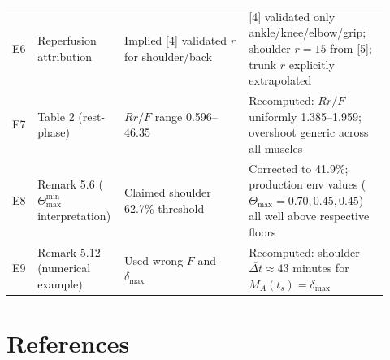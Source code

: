 \documentclass[11pt,a4paper]{article}
\begin{document}
\begin{center}
\begin{tabular}{p{0.04\linewidth}p{0.20\linewidth}p{0.32\linewidth}p{0.36\linewidth}}
E6 & Reperfusion attribution & Implied [4] validated $r$ for shoulder/back & [4] validated only ankle/knee/elbow/grip; shoulder $r=15$ from [5]; trunk $r$ explicitly extrapolated \\
E7 & Table 2 (rest-phase) & $Rr/F$ range 0.596--46.35 & Recomputed: $Rr/F$ uniformly 1.385--1.959; overshoot generic across all muscles \\
E8 & Remark 5.6 ($\Theta_{\max}^{\min}$ interpretation) & Claimed shoulder 62.7\% threshold & Corrected to 41.9\%; production env values ($\Theta_{\max} = 0.70, 0.45, 0.45$) all well above respective floors \\
E9 & Remark 5.12 (numerical example) & Used wrong $F$ and $\delta_{\max}$ & Recomputed: shoulder $\overline{\Delta t} \approx 43$ minutes for $M_A(t_s) = \delta_{\max}$ \\
\bottomrule
\end{tabular}
\end{center}

\section*{References}
\end{document}
